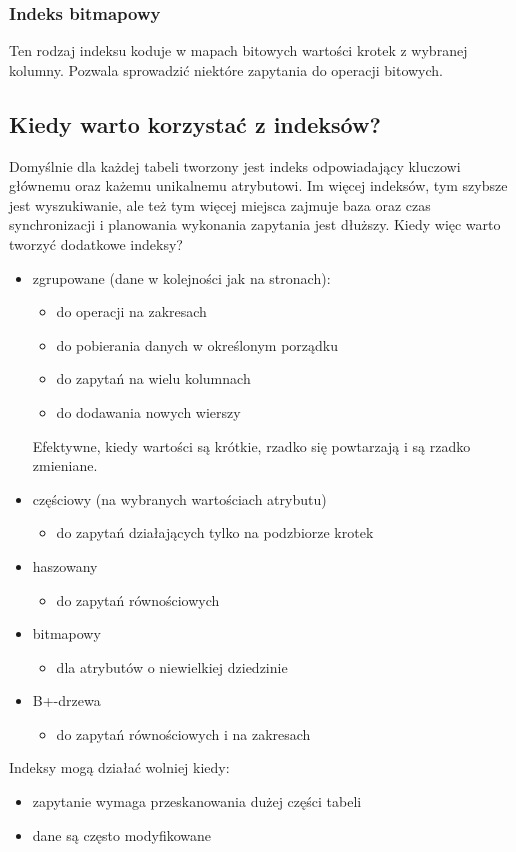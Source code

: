 \subsubsection*{Indeks bitmapowy}
Ten rodzaj indeksu koduje w mapach bitowych wartości krotek z wybranej kolumny. Pozwala sprowadzić niektóre zapytania do operacji bitowych.

\subsection{Kiedy warto korzystać z indeksów?}
Domyślnie dla każdej tabeli tworzony jest indeks odpowiadający kluczowi głównemu oraz każemu unikalnemu atrybutowi.
Im więcej indeksów, tym szybsze jest wyszukiwanie, ale też tym więcej miejsca zajmuje baza oraz czas synchronizacji i planowania wykonania zapytania jest dłuższy.
Kiedy więc warto tworzyć dodatkowe indeksy?
\begin{itemize}
    \item zgrupowane (dane w kolejności jak na stronach):
    \begin{itemize}
        \item do operacji na zakresach
        \item do pobierania danych w określonym porządku
        \item do zapytań na wielu kolumnach
        \item do dodawania nowych wierszy
    \end{itemize}
    Efektywne, kiedy wartości są krótkie, rzadko się powtarzają i są rzadko zmieniane.
    \item częściowy (na wybranych wartościach atrybutu)
    \begin{itemize}
        \item do zapytań działających tylko na podzbiorze krotek
    \end{itemize}
    \item haszowany
    \begin{itemize}
        \item do zapytań równościowych
    \end{itemize}
    \item bitmapowy
    \begin{itemize}
        \item dla atrybutów o niewielkiej dziedzinie
    \end{itemize}
    \item B+-drzewa
    \begin{itemize}
        \item do zapytań równościowych i na zakresach
    \end{itemize}
\end{itemize}

Indeksy mogą działać wolniej kiedy:
\begin{itemize}
    \item zapytanie wymaga przeskanowania dużej części tabeli
    \item dane są często modyfikowane
\end{itemize}
